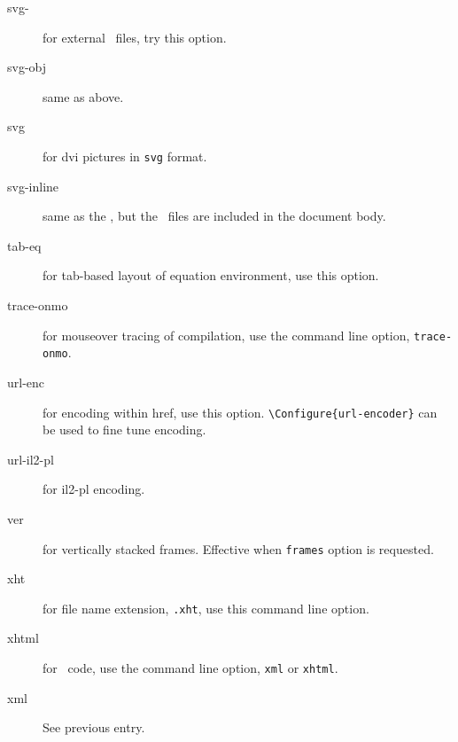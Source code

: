 \begin{description}

\item[svg-] for external \svg\ files, try this option.

\item[svg-obj] same as above.

\item[svg] for dvi pictures in \verb=svg= format.

\item[svg-inline] same as the , but the \svg\ files are included in the document body.

\item[tab-eq] for tab-based layout of equation environment, use this
  option.


\item[trace-onmo] for mouseover tracing of compilation, use the
  command line option, \verb=trace-onmo=.



\item[url-enc] for \space encoding within href, use this
  option.  \verb=\Configure{url-encoder}= can be used to fine tune
  encoding.

\item[url-il2-pl] for il2-pl  encoding.

\item[ver] for vertically stacked frames. Effective when \verb=frames=
  option is requested.


\item[xht] for file name extension, \verb=.xht=, use this command line
  option.

\item[xhtml] for \xml\ code, use the command line option, \verb=xml= or
  \verb=xhtml=.

\item[xml] See previous entry.


\end{description}

